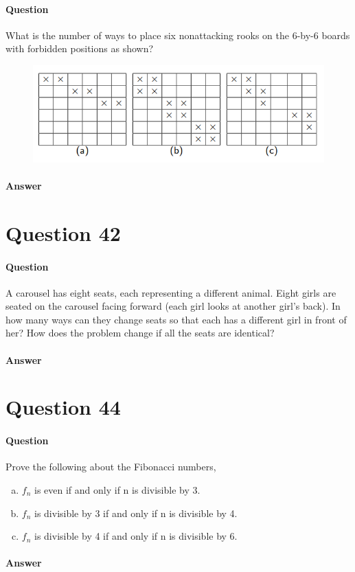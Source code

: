 \documentclass[UTF8]{article}
\begin{document}
    \paragraph{Question}
    What is the number of ways to place six nonattacking rooks on the 6-by-6 boards with forbidden positions as shown?
    \begin{figure}[ht]
        \centering
        \includegraphics[scale=0.6]{img/t41.png}
        \end{figure}
    
    \paragraph{Answer}
    \begin{center}
    \end{center}

    \section{Question 42}
    \paragraph{Question}
    A carousel has eight seats, each representing a different animal. Eight girls are seated on the carousel facing forward (each girl looks at another girl’s back). In how many ways can they change seats so that each has a different girl in front of her? How does the problem change if all the seats are identical?
    \paragraph{Answer}
    \begin{center}
    \end{center}

    \section{Question 44}
    \paragraph{Question}
    Prove the following about the Fibonacci numbers,
    \begin{enumerate}[(a)]
        \item $ f_{n} $ is even if and only if n is divisible by 3.
        \item $ f_{n} $ is divisible by 3 if and only if n is divisible by 4.
        \item $ f_{n} $ is divisible by 4 if and only if n is divisible by 6.
    \end{enumerate}
    \paragraph{Answer}
    \begin{center}
    \end{center}
    
\end{document}
